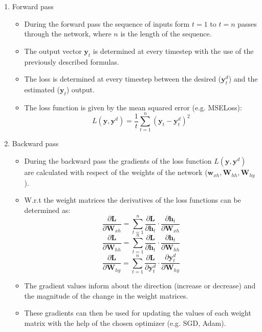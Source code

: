 \begin{enumerate}
    \item Forward pass
    \begin{itemize}
        \item During the forward pass the sequence of inputs form $t=1$ to $t=n$ passes through the network, where $n$ is the length of the sequence.
        \item The output vector $\mathbf{y}_t$ is determined at every timestep with the use of the previously described formulas. 
        \item The loss is determined at every timestep between the desired ($\mathbf{y}_t^{d}$) and the estimated ($\mathbf{y}_t$) output. 
        \item The loss function is given by the mean squared error (e.g. MSELoss):
        \begin{equation}
            L(\mathbf{y}, \mathbf{y}^d) = \frac{1}{t} \sum_{t=1}^{n} (\mathbf{y}_t - \mathbf{y}_t^d)^2
        \end{equation}
    \end{itemize}
    \item Backward pass
        \begin{itemize}
        \item During the backward pass the gradients of the loss function  $L(\mathbf{y}, \mathbf{y}^d)$ are calculated with respect of the weights of the network ($\mathbf{w}_{xh}, \mathbf{W}_{hh}, \mathbf{W}_{hy}$). 
        \item W.r.t the weight matrices the derivatives of the loss functions can be determined as:
        \begin{equation}
            \frac{\partial \mathbf{L}}{\partial \mathbf{W}_{xh}} = \sum_{t=1}^n \frac{\partial \mathbf{L}}{\partial \mathbf{h}_t} \cdot \frac{\partial \mathbf{h}_t}{\partial \mathbf{W}_{xh}}
        \end{equation}
        \begin{equation}
            \frac{\partial \mathbf{L}}{\partial \mathbf{W}_{hh}} = \sum_{t=1}^n \frac{\partial \mathbf{L}}{\partial \mathbf{h}_t} \cdot \frac{\partial \mathbf{h}_t}{\partial \mathbf{W}_{hh}}
        \end{equation}
        \begin{equation}
            \frac{\partial \mathbf{L}}{\partial \mathbf{W}_{hy}} = \sum_{t=1}^n \frac{\partial \mathbf{L}}{\partial \mathbf{y}_t^d} \cdot \frac{\partial \mathbf{y}_t^d}{\partial \mathbf{W}_{hy}}
        \end{equation}
        \item The gradient values inform about the direction (increase or decrease) and the magnitude of the change in the weight matrices. 
        \item These gradients can then be used for updating the values of each weight matrix with the help of the chosen optimizer (e.g. SGD, Adam).
    \end{itemize}
\end{enumerate}

